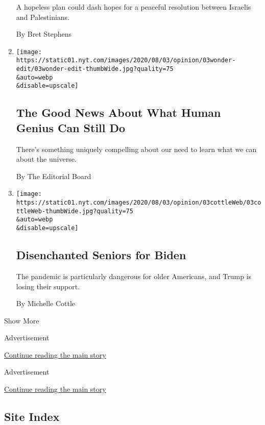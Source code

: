 \begin{enumerate}
  A hopeless plan could dash hopes for a peaceful resolution between
  Israelis and Palestinians.

  By Bret Stephens
\item
  \href{/2020/08/03/opinion/spacex-stonehenge-mars.html}{}

  \texttt{[image: https://static01.nyt.com/images/2020/08/03/opinion/03wonder-edit/03wonder-edit-thumbWide.jpg?quality=75\\\&auto=webp\\\&disable=upscale]}

  \hypertarget{the-good-news-about-what-human-genius-can-still-do}{%
  \subsection{The Good News About What Human Genius Can Still
  Do}\label{the-good-news-about-what-human-genius-can-still-do}}

  There's something uniquely compelling about our need to learn what we
  can about the universe.

  By The Editorial Board
\item
  \href{/2020/08/03/opinion/senior-voters-biden-trump-2020.html}{}

  \texttt{[image: https://static01.nyt.com/images/2020/08/03/opinion/03cottleWeb/03cottleWeb-thumbWide.jpg?quality=75\\\&auto=webp\\\&disable=upscale]}

  \hypertarget{disenchanted-seniors-for-biden}{%
  \subsection{Disenchanted Seniors for
  Biden}\label{disenchanted-seniors-for-biden}}

  The pandemic is particularly dangerous for older Americans, and Trump
  is losing their support.

  By Michelle Cottle
\end{enumerate}

Show More

Advertisement

\protect\hyperlink{after-mid2}{Continue reading the main story}

Advertisement

\protect\hyperlink{after-mktg}{Continue reading the main story}

\hypertarget{site-index}{%
\subsection{Site Index}\label{site-index}}

